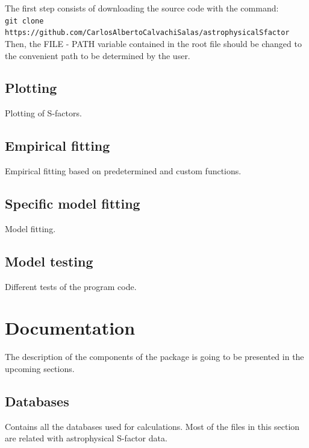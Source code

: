 \documentclass[openany]{book}
\begin{document}
The first step consists of downloading the source code with the command: \\

\texttt{git clone https://github.com/CarlosAlbertoCalvachiSalas/astrophysicalSfactor} \\

Then, the FILE - PATH variable contained in the root file should be changed to the convenient path to be determined by the user.

\subsection{Plotting}  \label{sub:codesPlotting}

Plotting of S-factors. 

\subsection{Empirical fitting} \label{sub:codesEmpiricalFitting}

Empirical fitting based on predetermined and custom functions.

\subsection{Specific model fitting}  \label{sub:codesModelFitting}

Model fitting.

\subsection{Model testing} \label{sub:codesModelTesting}

Different tests of the program code. 

\section{Documentation} \label{sec:documentation}

The description of the components of the package is going to be presented in the upcoming sections.


\subsection{Databases} \label{sub:codesDatabases}

Contains all the databases used for calculations. Most of the files in this section are related with astrophysical S-factor data. 
\end{document}
